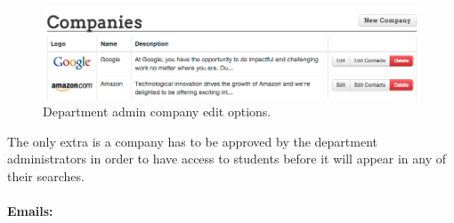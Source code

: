     \begin{figure}[H]\centering
    \includegraphics[scale=0.5]{images/user_experiences/admin/admin_company_edit_options}
    \caption{Department admin company edit options.}
    \end{figure}

    The only extra is a company has to be approved by the department administrators in order to have access to students before it will appear in any of their searches.




  \paragraph{Emails:}
